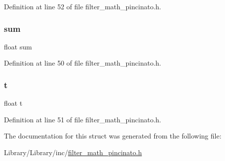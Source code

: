 Definition at line 52 of file filter\+\_\+math\+\_\+pincinato.\+h.

\mbox{\label{struct___integratal_data___aeeafe7e9eebbd2a45ce4fa2ae0d96c51}} 
\subsubsection{\texorpdfstring{sum}{sum}}
{\footnotesize\ttfamily float sum}



Definition at line 50 of file filter\+\_\+math\+\_\+pincinato.\+h.

\mbox{\label{struct___integratal_data___afea36502e9d227ff62c5fb2719a246f2}} 
\subsubsection{\texorpdfstring{t}{t}}
{\footnotesize\ttfamily float t}



Definition at line 51 of file filter\+\_\+math\+\_\+pincinato.\+h.



The documentation for this struct was generated from the following file\+:\begin{DoxyCompactItemize}
\item 
Library/\+Library/inc/\mbox{\hyperlink{filter__math__pincinato_8h}{filter\+\_\+math\+\_\+pincinato.\+h}}\end{DoxyCompactItemize}
